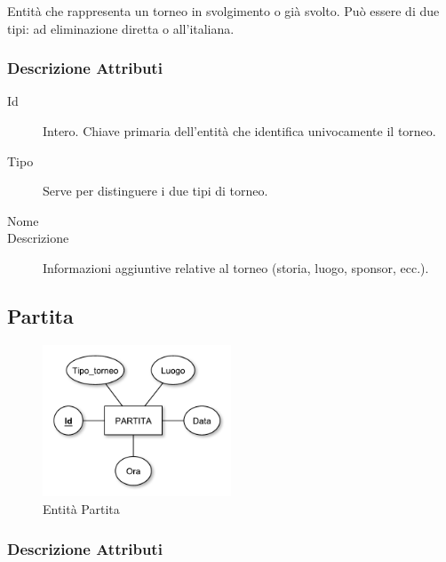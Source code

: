 		Entità che rappresenta un torneo in svolgimento o già svolto. Può essere di due tipi: ad eliminazione diretta o all'italiana.
		
		\subsubsection*{Descrizione Attributi}
		
		\begin{description}
			
			\item[Id]
			Intero. Chiave primaria dell'entità che identifica univocamente il torneo.
			
			\item[Tipo]
			Serve per distinguere i due tipi di torneo.
			
			\item[Nome]
			
			
			\item[Descrizione]
			Informazioni aggiuntive relative al torneo (storia, luogo, sponsor, ecc.).
			
		\end{description}
	
	\subsection{Partita}
		
		\begin{figure}[h]
			\centering
			\includegraphics[width=0.5\textwidth]
			{immagini/07-partita}
			
			\caption{Entità Partita}
		\end{figure}
		
		\subsubsection*{Descrizione Attributi}
		
